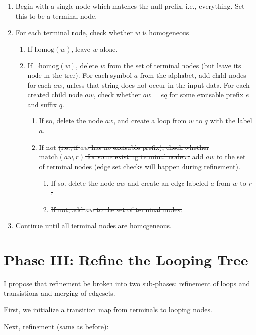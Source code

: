 \documentclass{article}
\newcommand{\match}{\ensuremath{\mathrm{match}}}
\newcommand{\homog}{\ensuremath{\mathrm{homog}}}
\begin{document}
\begin{enumerate}
\item Begin with a single node which matches the null prefix, i.e., everything.
  Set this to be a terminal node.
\item For each terminal node, check whether $w$ is homogeneous
  \begin{enumerate}
  \item If $\homog(w)$, leave $w$ alone.
  \item If $\neg\homog(w)$, delete $w$ from the set of terminal nodes (but
    leave its node in the tree).  For each symbol $a$ from the alphabet, add
    child nodes for each $aw$, unless that string does not occur in the input
    data.  For each created child node $aw$, check whether $aw=eq$ for some
    excisable prefix $e$ and suffix $q$.
    \begin{enumerate}
    \item If so, delete the node $aw$, and create a loop from $w$ to $q$ with
      the label $a$.
    \item If not \sout{(i.e., if $aw$ has no excisable prefix), check whether
      $\match(aw,r)$ for some existing terminal node $r$.} add $aw$ to the set
      of terminal nodes (edge set checks will happen during refinement).
      \begin{enumerate}
      \item \sout{If so, delete the node $aw$ and create an edge labeled $a$ from $w$
        to $r$.}
      \item \sout{If not, add $aw$ to the set of terminal nodes.}
      \end{enumerate}
    \end{enumerate}
  \end{enumerate}
\item Continue until all terminal nodes are homogeneous.
\end{enumerate}

\section{Phase III: Refine the Looping Tree}

I propose that refinement be broken into two sub-phases: refinement of
loops and transistions and merging of edgesets.

First, we initialize a transition map from terminals to looping nodes.

Next, refinement (same as before):
\end{document}
